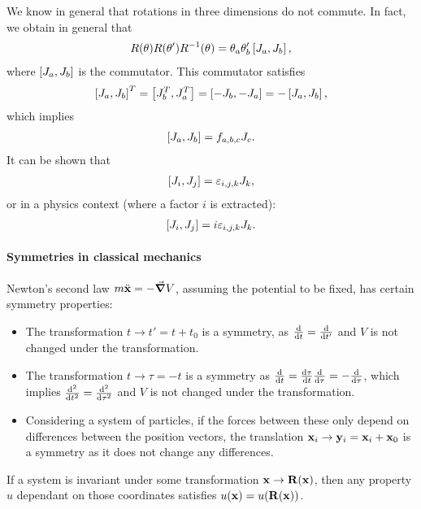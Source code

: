 We know in general that rotations in three dimensions do not commute. In fact, we obtain in general that
\begin{align*}
R(\vb{\theta})R(\vb{\theta}')R^{-1}(\vb{\theta}) = \theta_{a}\theta_{b}'\left[J_{a}, J_{b}\right],
\end{align*}
where $\left[J_{a}, J_{b}\right]$ is the commutator. This commutator satisfies
\begin{align*}
\left[J_{a}, J_{b}\right]^{T} = \left[J_{b}^{T}, J_{a}^{T}\right] = \left[-J_{b}, -J_{a}\right] = -\left[J_{a}, J_{b}\right],
\end{align*}
which implies
\begin{align*}
\left[J_{a}, J_{b}\right] = f_{a,b,c}J_{c}.
\end{align*}
It can be shown that
\begin{align*}
\left[J_{i}, J_{j}\right] = \varepsilon_{i,j,k}J_{k},
\end{align*}
or in a physics context (where a factor $i$ is extracted):
\begin{align*}
\left[J_{i}, J_{j}\right] = i\varepsilon_{i,j,k}J_{k}.
\end{align*}

\paragraph{Symmetries in classical mechanics}

Newton's second law $m\ddot{\vb{x}} = -\grad{V}$, assuming the potential to be fixed, has certain symmetry properties:
\begin{itemize}
	\item The transformation $t\to t' = t + t_{0}$ is a symmetry, as $\dv{t} = \dv{t'}$ and $V$ is not changed under the transformation.
	\item The transformation $t\to\tau = -t$ is a symmetry as $\dv{t} = \dv{\tau}{t}\dv{\tau} = -\dv{\tau}$, which implies $\dv[2]{t} = \dv[2]{\tau}$ and $V$ is not changed under the transformation.
	\item Considering a system of particles, if the forces between these only depend on differences between the position vectors, the translation $\vb{x}_{i}\to\vb{y}_{i} = \vb{x}_{i} + \vb{x}_{0}$ is a symmetry as it does not change any differences.
\end{itemize}

If a system is invariant under some transformation $\vb{x}\to\vb{R}(\vb{x})$, then any property $u$ dependant on those coordinates satisfies $u(\vb{x}) = u(\vb{R}(\vb{x}))$.

